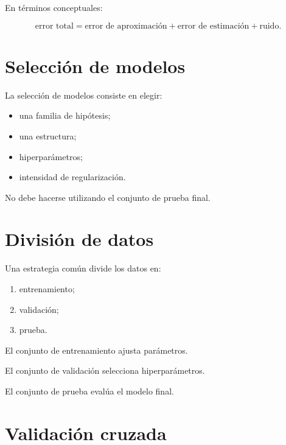 \documentclass[
  spanish,
  10.5pt,
  letterpaper,
  DIV=11,
  numbers=noendperiod,
  oneside,
  open=any]{scrreprt}
\providecommand{\tightlist}{%
  \setlength{\itemsep}{0pt}\setlength{\parskip}{0pt}}
\theoremstyle{definition}
\theoremstyle{definition}
\theoremstyle{plain}
\theoremstyle{remark}
\begin{document}
En términos conceptuales:

\[
\text{error total}
=
\text{error de aproximación}
+
\text{error de estimación}
+
\text{ruido}.
\]

\section*{Selección de modelos}\label{selecciuxf3n-de-modelos}


La selección de modelos consiste en elegir:

\begin{itemize}
\tightlist
\item
  una familia de hipótesis;
\item
  una estructura;
\item
  hiperparámetros;
\item
  intensidad de regularización.
\end{itemize}

No debe hacerse utilizando el conjunto de prueba final.

\section*{División de datos}\label{divisiuxf3n-de-datos}


Una estrategia común divide los datos en:

\begin{enumerate}
\def\labelenumi{\arabic{enumi}.}
\tightlist
\item
  entrenamiento;
\item
  validación;
\item
  prueba.
\end{enumerate}

El conjunto de entrenamiento ajusta parámetros.

El conjunto de validación selecciona hiperparámetros.

El conjunto de prueba evalúa el modelo final.

\section*{Validación cruzada}\label{validaciuxf3n-cruzada}
\end{document}
